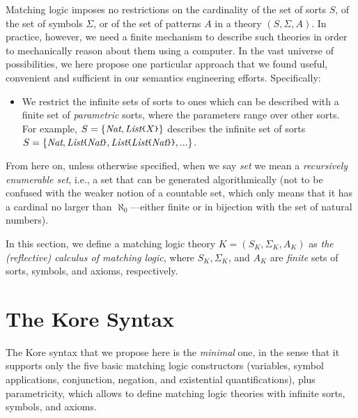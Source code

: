\documentclass[UTF8,11pt]{article}
\theoremstyle{plain}
\theoremstyle{definition}
\theoremstyle{remark}
\newcommand{\Nat}{\textit{Nat}}
\newcommand{\List}{\textit{List}}
\newcommand{\parametric}[2]{{#1}\raisebox{.2ex}{\texttt{\footnotesize{\{}}}#2\raisebox{.2ex}{\texttt{\footnotesize{\}}}}}
\begin{document}
Matching logic imposes no restrictions on the cardinality of the set of
sorts $S$, of the set of symbols $\Sigma$, or of the set of patterns $A$
in a theory $(S,\Sigma,A)$.
In practice, however, we need a finite mechanism to describe such theories
in order to mechanically reason about them using a computer.
In the vast universe of possibilities, we here propose one particular approach
that we found useful, convenient and sufficient in our semantics engineering
efforts.
Specifically:
\begin{itemize}
\item
We restrict the infinite sets of sorts to ones which can be described with
a finite set of \emph{parametric} sorts, where the parameters range over
other sorts.
For example, $S=\{\Nat,\parametric{\List}{X}\}$ describes the infinite set
of sorts
$S=\{\Nat, \parametric{\List}{\Nat}, \parametric{\List}{\parametric{\List}{\Nat}}, ...\}$.

\end{itemize}

From here on, unless otherwise specified, when we say \emph{set} we mean
a \emph{recursively enumerable set}, i.e., a set that can be generated
algorithmically (not to be confused with the weaker notion of a
countable
set, which only means that it has a cardinal no larger than
$\aleph_0$---either finite or in bijection with the set
of natural numbers).


In this section, we define a matching logic theory $K = (S_K, \Sigma_K, A_K)$ 
as \emph{the (reflective) calculus of matching logic},
where $S_K, \Sigma_K$, and $A_K$ are \emph{finite} sets of sorts,
symbols, and axioms,  respectively.



\section{The Kore Syntax}

The Kore syntax that we propose here is the \emph{minimal} one, in the sense that it supports only the five basic matching logic constructors (variables, symbol applications, conjunction, negation, and existential quantifications), plus parametricity, which allows to define matching logic theories with infinite sorts, symbols, and axioms.
\end{document}
